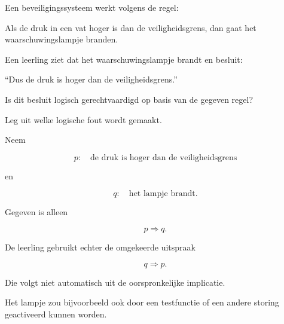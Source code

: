 \documentclass{ximera}
\begin{document}
\begin{oefening}{\oefU\ESS}

Een beveiligingssysteem werkt volgens de regel:

\begin{center}
Als de druk in een vat hoger is dan de veiligheidsgrens,
dan gaat het waarschuwingslampje branden.
\end{center}

Een leerling ziet dat het waarschuwingslampje brandt en besluit:

\begin{center}
``Dus de druk is hoger dan de veiligheidsgrens.''
\end{center}

\begin{question}

Is dit besluit logisch gerechtvaardigd op basis van de gegeven regel?

\begin{multipleChoice}



\end{multipleChoice}

\end{question}

\begin{question}

Leg uit welke logische fout wordt gemaakt.

\begin{oplossing}

Neem

\[
p:\quad \text{de druk is hoger dan de veiligheidsgrens}
\]

en

\[
q:\quad \text{het lampje brandt}.
\]

Gegeven is alleen

\[
p\Rightarrow q.
\]

De leerling gebruikt echter de omgekeerde uitspraak

\[
q\Rightarrow p.
\]

Die volgt niet automatisch uit de oorspronkelijke implicatie.

Het lampje zou bijvoorbeeld ook door een testfunctie of een andere
storing geactiveerd kunnen worden.

\end{oplossing}

\end{question}

\end{oefening}
\end{document}
